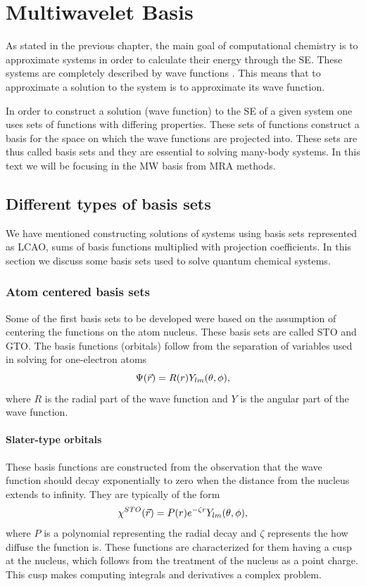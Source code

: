 \documentclass[../master_thesis.tex]{subfiles}
\begin{document}
\chapter{Multiwavelet Basis}\label{chap:MW_basis}
As stated in the previous chapter, the main goal of computational chemistry is
to approximate systems in order to calculate their energy through the \ac{SE}. %
These systems are completely described by wave functions \cite{Cohen:1973}.
This means that to approximate a solution to the system is to approximate its
wave function.

In order to construct a solution (wave function) to the \ac{SE} of a given
system one uses sets of functions with differing properties. These
sets of functions construct a basis for the space on which the wave functions
are projected into. These sets are thus called basis sets \cite{Cramer:2004}
and they are essential to solving many-body systems. In this text we will be
focusing in the \ac{MW} basis from \ac{MRA} methods.

\section{Different types of basis sets}
We have mentioned constructing solutions of systems using basis sets represented as
\ac{LCAO}, sums of basis functions multiplied with projection coefficients.
In this section we discuss some basis sets used to solve quantum chemical systems.

\subsection{Atom centered basis sets}
Some of the first basis sets to be developed were based on the assumption of
centering the functions on the atom nucleus. These basis sets are called \ac{STO}
and \ac{GTO}. The basis functions (orbitals) follow from the separation of variables
used in solving for one-electron atoms
\begin{equation}
  \Psi(\vec{r}) = R(r)Y_{lm}(\theta, \phi),
\end{equation}
where $R$ is the radial part of the wave function and $Y$ is the angular part of
the wave function.

\subsubsection{Slater-type orbitals}
These basis functions are constructed from the observation that the wave function
should decay exponentially to zero when the distance from the nucleus extends
to infinity. They are typically of the form \cite{Jensen:2017, ESQCB1P1}
\begin{equation}
  \chi^{STO}(\vec{r}) = P(r)e^{-\zeta r}Y_{lm}(\theta, \phi),
\end{equation}
where $P$ is a polynomial representing the radial decay and $\zeta$ represents the
how diffuse the function is. These functions are characterized for them having a cusp
at the nucleus, which follows from the treatment of the nucleus as a point charge.
This cusp makes computing integrals and derivatives a complex problem.
\end{document}
